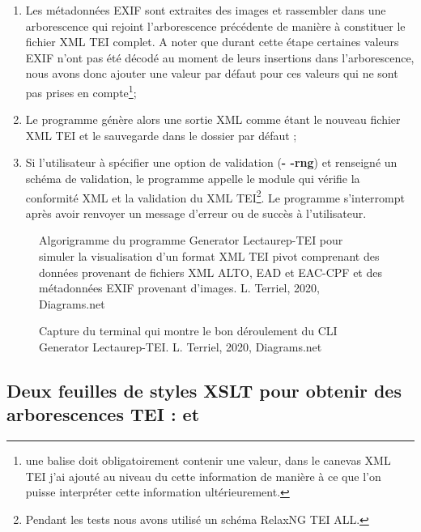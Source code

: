 \begin{enumerate}
    \item Les métadonnées EXIF sont extraites des images et rassembler dans une arborescence  qui rejoint l'arborescence précédente de manière à constituer le fichier XML TEI complet. A noter que durant cette étape certaines valeurs EXIF n'ont pas été décodé au moment de leurs insertions dans l'arborescence, nous avons donc ajouter une valeur par défaut  pour ces valeurs qui ne sont pas prises en compte\footnote{une balise  doit obligatoirement contenir une valeur, dans le canevas XML TEI j'ai ajouté au niveau du  cette information de manière à ce que l'on puisse interpréter cette information ultérieurement.};
    \item Le programme génère alors une sortie XML comme étant le nouveau fichier XML TEI et le sauvegarde dans le dossier par défaut 
    ;
    \item Si l'utilisateur à spécifier une option de validation (\textbf{- -rng}) et renseigné un schéma de validation, le programme appelle le module  qui vérifie la conformité XML et la validation du XML TEI\footnote{Pendant les tests nous avons utilisé un schéma RelaxNG TEI ALL.}. Le programme s'interrompt après avoir renvoyer un message d'erreur ou de succès à l'utilisateur.
\end{enumerate}
\begin{figure}[H]
    \centering
    \centerline{}
    \caption{Algorigramme du programme Generator Lectaurep-TEI pour simuler la visualisation d'un format XML TEI pivot comprenant des données provenant de fichiers XML ALTO, EAD et EAC-CPF et des métadonnées EXIF provenant d'images.   \textcopyright L. Terriel, 2020, Diagrams.net}
    \label{fig:generateur_tei}
\end{figure}
\begin{figure}[h]
    \centering
    \centerline{}
    \caption{Capture du terminal qui montre le bon déroulement du CLI Generator Lectaurep-TEI.   \textcopyright L. Terriel, 2020, Diagrams.net}
    \label{fig:prompt-lec-tei}
\end{figure}

\subsection{Deux feuilles de styles XSLT pour obtenir des arborescences TEI :  et }

